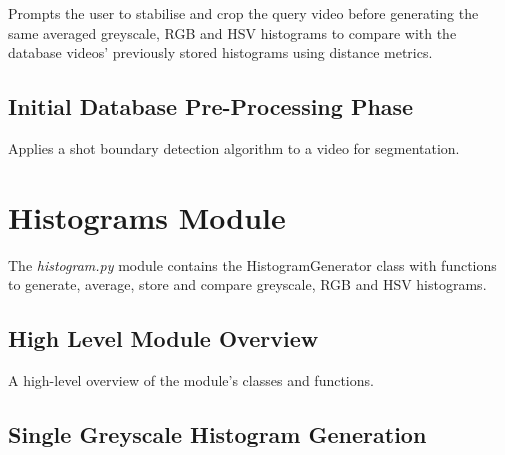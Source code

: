 Prompts the user to stabilise and crop the query video before generating the same averaged greyscale, RGB and HSV histograms to compare with the database videos' previously stored histograms using distance metrics.




\subsection{Initial Database Pre-Processing Phase}
\label{sec:code-database_preprocessing_phase}

Applies a shot boundary detection algorithm to a video for segmentation.




\clearpage
\section{Histograms Module}

The \textit{histogram.py} module contains the HistogramGenerator class with functions to generate, average, store and compare greyscale, RGB and HSV histograms.


\subsection{High Level Module Overview}
\label{sec:code-high-level-module-overview}

A high-level overview of the module's classes and functions.




\subsection{Single Greyscale Histogram Generation}
\label{sec:code-single_grey_histogram_generation}

